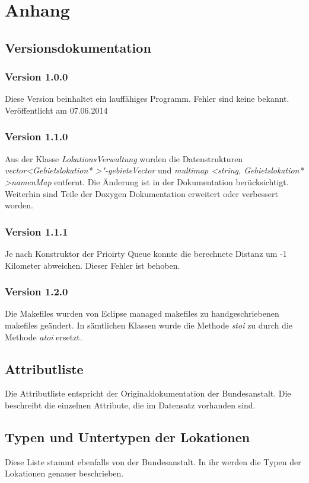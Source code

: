 \documentclass[12pt, a4paper, ngerman]{article}
\begin{document}
\section{Anhang}
\subsection{Versionsdokumentation}
\subsubsection{Version 1.0.0}
Diese Version beinhaltet ein lauffähiges Programm. Fehler sind keine bekannt. Veröffentlicht am 07.06.2014
\subsubsection{Version 1.1.0}
Aus der Klasse \textit{LokationsVerwaltung} wurden die Datenstrukturen \textit{vector\textless Gebietslokation* \textgreater "-gebieteVector} und \textit{multimap \textless string, Gebietslokation* \textgreater namenMap} entfernt. Die Änderung ist in der Dokumentation berücksichtigt. Weiterhin sind Teile der Doxygen Dokumentation erweitert oder verbessert worden.

\subsubsection{Version 1.1.1}
Je nach Konstruktor der Prioirty Queue konnte die berechnete Distanz um -1 Kilometer abweichen. Dieser Fehler ist behoben.

\subsubsection{Version 1.2.0}
Die Makefiles wurden von Eclipse managed makefiles zu handgeschriebenen makefiles geändert. In sämtlichen Klassen wurde die Methode \textit{stoi} zu durch die Methode \textit{atoi} ersetzt.

\subsection{Attributliste \label{bundAttributListe}}
Die Attributliste entspricht der Originaldokumentation der Bundesanstalt. Die beschreibt die einzelnen Attribute, die im Datensatz vorhanden sind.


\subsection{Typen und Untertypen der Lokationen \label{bundFeinDoku}}
Diese Liste stammt ebenfalls von der Bundesanstalt. In ihr werden die Typen der Lokationen genauer beschrieben.

\end{document}
